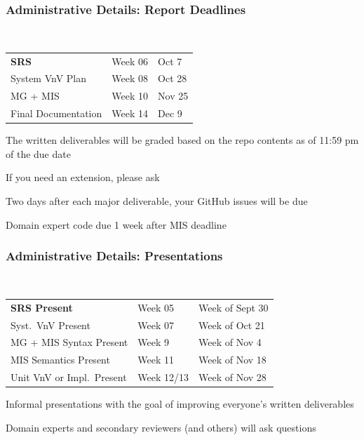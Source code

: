 \documentclass[t,12pt,numbers,fleqn]{beamer}
\begin{document}

\begin{frame}
\frametitle{Administrative Details: Report Deadlines}
~\newline
\begin{tabular}{l l l}
\textbf{SRS} & Week 06 & Oct 7\\
System VnV Plan & Week 08 & Oct 28\\
MG + MIS & Week 10 & Nov 25\\
Final Documentation & Week 14 & Dec 9\\
\end {tabular}

\bi
\item The written deliverables will be graded based on the repo contents as of
11:59 pm of the due date
\item If you need an extension, please ask
\item Two days after each major deliverable, your GitHub issues will be due
\item Domain expert code due 1 week after MIS deadline
\ei

\end{frame}


\begin{frame}
\frametitle{Administrative Details: Presentations}

~\newline
\begin{tabular}{l l l}
\textbf{SRS Present} & Week 05 & Week of Sept 30\\
Syst.\ VnV Present & Week 07 & Week of Oct 21\\
MG + MIS Syntax Present & Week 9 & Week of Nov 4\\
MIS Semantics Present & Week 11 & Week of Nov 18\\
Unit VnV or Impl.\ Present & Week 12/13 & Week of Nov 28\\
\end {tabular}

\bi
\item Informal presentations with the goal of improving everyone's written
  deliverables
\item Domain experts and secondary reviewers (and others) will ask questions
\ei

\end{frame}

\end{document}

